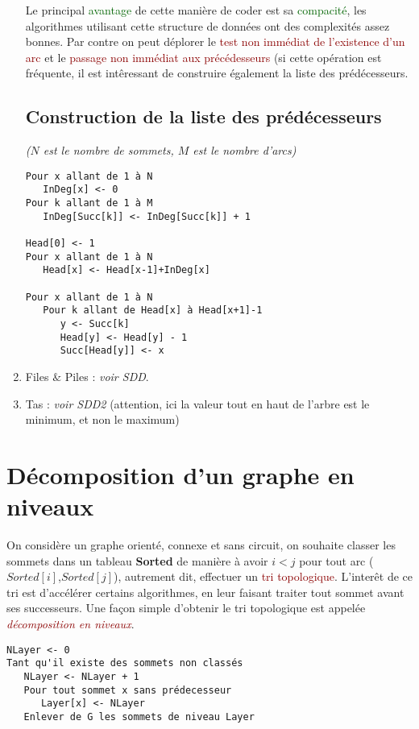 \documentclass{article}
\newcommand{\gre}[1]{\textcolor{darkgreen}{#1}}
\newcommand{\red}[1]{\textcolor{darkred}{#1}}
\begin{document}
\begin{enumerate}
Le principal \gre{avantage} de cette manière de coder est sa \gre{compacité}, les algorithmes utilisant cette structure de données ont des complexités assez bonnes. Par contre on 
peut déplorer le \red{test non immédiat de l'existence d'un arc} et le \red{passage non immédiat aux précédesseurs} (si cette opération est fréquente, il est intêressant de 
construire également la liste des prédécesseurs.

\subsection{Construction de la liste des prédécesseurs}
\textit{($N$ est le nombre de sommets, $M$ est le nombre d'arcs)}
\begin{verbatim}
Pour x allant de 1 à N
   InDeg[x] <- 0
Pour k allant de 1 à M
   InDeg[Succ[k]] <- InDeg[Succ[k]] + 1

Head[0] <- 1
Pour x allant de 1 à N
   Head[x] <- Head[x-1]+InDeg[x]

Pour x allant de 1 à N
   Pour k allant de Head[x] à Head[x+1]-1
      y <- Succ[k]
      Head[y] <- Head[y] - 1
      Succ[Head[y]] <- x
\end{verbatim}

\item Files $\&$ Piles : \textit{voir SDD}.
\item Tas : \textit{voir SDD2} (attention, ici la valeur tout en haut de l'arbre est le minimum, et non le maximum)
\end{enumerate}

\section{Décomposition d'un graphe en niveaux}

On considère un graphe orienté, connexe et sans circuit, on souhaite classer les sommets dans un tableau \textbf{Sorted} de manière à avoir $i < j$ pour tout arc 
($Sorted[i]$,$Sorted[j]$), autrement dit, effectuer un \red{tri topologique}. L'interêt de ce tri est d'accélérer certains algorithmes, en leur faisant traiter tout sommet avant ses 
successeurs. Une façon simple d'obtenir le tri topologique est appelée \textit{\red{décomposition en niveaux}}.
\begin{verbatim}
NLayer <- 0
Tant qu'il existe des sommets non classés
   NLayer <- NLayer + 1
   Pour tout sommet x sans prédecesseur
      Layer[x] <- NLayer
   Enlever de G les sommets de niveau Layer
\end{verbatim}
\end{document}
